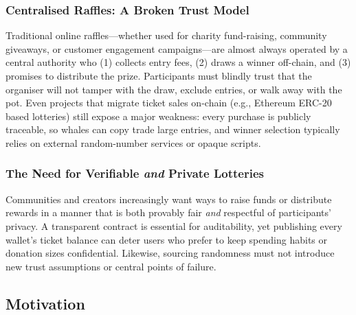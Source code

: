 \documentclass{article}
\begin{document}
\subsubsection{Centralised Raffles: A Broken Trust Model}
Traditional online raffles---whether used for charity fund-raising, community giveaways, or customer engagement campaigns---are almost always operated by a central authority who (1) collects entry fees, (2) draws a winner off-chain, and (3) promises to distribute the prize. Participants must blindly trust that the organiser will not tamper with the draw, exclude entries, or walk away with the pot. Even projects that migrate ticket sales on-chain (e.g., Ethereum ERC-20 based lotteries) still expose a major weakness: every purchase is publicly traceable, so whales can copy trade large entries, and winner selection typically relies on external random-number services or opaque scripts.

\subsubsection{The Need for Verifiable \emph{and} Private Lotteries}
Communities and creators increasingly want ways to raise funds or distribute rewards in a manner that is both provably fair \emph{and} respectful of participants' privacy. A transparent contract is essential for auditability, yet publishing every wallet's ticket balance can deter users who prefer to keep spending habits or donation sizes confidential. Likewise, sourcing randomness must not introduce new trust assumptions or central points of failure.

\subsection{Motivation}
\end{document}
